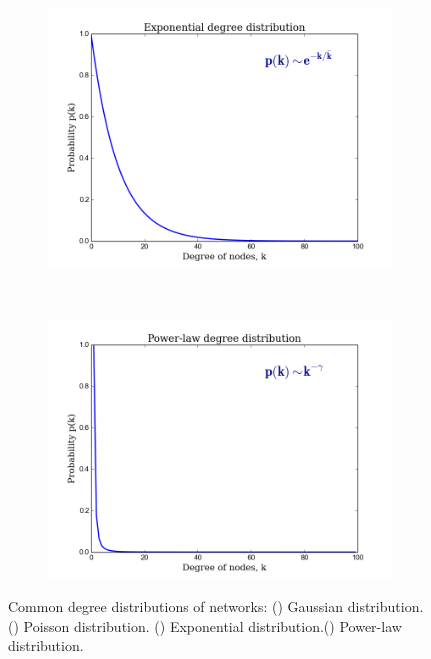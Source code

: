 \documentclass[10pt,a4paper]{article}
\begin{document}
\begin{figure}[H]
\begin{subfigure}[b]{0.45\textwidth}
		\caption{}
		\label{poss}
	\end{subfigure} \\   
	\begin{subfigure}[b]{0.45\textwidth}
		\includegraphics[width=\textwidth]{images/exp.png}
		\caption{}
		\label{expo}
	\end{subfigure}~
	\begin{subfigure}[b]{0.45\textwidth}
		\includegraphics[width=\textwidth]{images/p-law.png}
		\caption{}
		\label{powerlaw}
	\end{subfigure}
	\caption{Common degree distributions of networks: () Gaussian distribution. () Poisson distribution. () Exponential distribution.() Power-law distribution.}
	\label{distribution}
\end{figure} 
\end{document}
